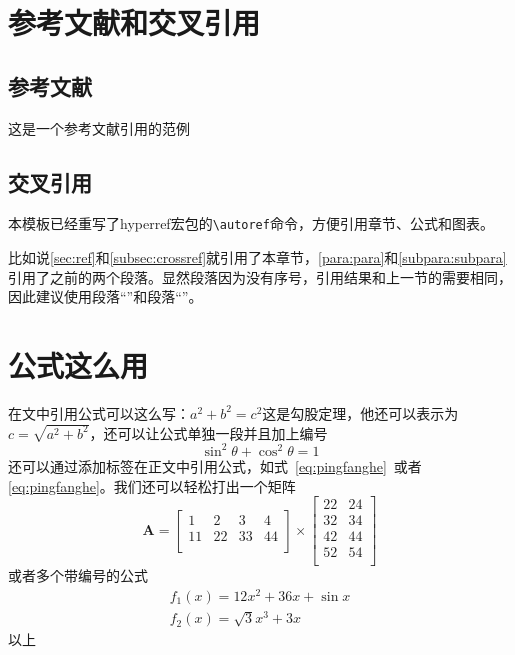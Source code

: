\documentclass[supercite]{HustGraduPaper}
\begin{document}
	
	
	
	
	
	
	
	
	\section{参考文献和交叉引用}\label{sec:ref}
	\subsection{参考文献}
	这是一个参考文献引用的范例\cite{9326394, Renzo2019,5502350, liang2019large, CHN_zhou2020, CHN_zhang2017}
	

	
	
	\subsection{交叉引用}\label{subsec:crossref}
	本模板已经重写了hyperref宏包的\verb|\autoref|命令，方便引用章节、公式和图表。
	
	比如说\autoref{sec:ref}和\autoref{subsec:crossref}就引用了本章节，\autoref{para:para}和\autoref{subpara:subpara}引用了之前的两个段落。显然段落因为没有序号，引用结果和上一节的需要相同，因此建议使用段落“”和段落“”。
	
	\section{公式这么用}
	在文中引用公式可以这么写：$a^2+b^2=c^2$这是勾股定理，他还可以表示为$c=\sqrt{a^2+b^2}$，还可以让公式单独一段并且加上编号
	\begin{equation}
	\sin^2{\theta}+\cos^2{\theta}=1 \label{eq:pingfanghe}
	\end{equation}
	还可以通过添加标签在正文中引用公式，如式~\eqref{eq:pingfanghe}~或者\autoref{eq:pingfanghe}。我们还可以轻松打出一个矩阵
	\begin{equation}
	\bm{A}=\begin{bmatrix}
	1&2&3&4\\
	11&22&33&44\\
	\end{bmatrix}
	\times\begin{bmatrix}
	22&24\\
	32&34\\
	42&44\\
	52&54\\
	\end{bmatrix}
	\end{equation}
	或者多个带编号的公式
	\begin{eqnarray}
	f_1(x)=12x^2+36x+\sin x\\
	f_2(x)=\sqrt{3}{x^3+3x}
	\end{eqnarray}
	以上
	
\end{document}
